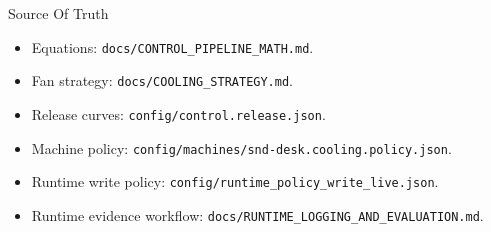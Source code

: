 \documentclass[aspectratio=169]{beamer}
\newcommand{\cfg}{\texttt}
\begin{document}
\begin{frame}{Source Of Truth}
  \begin{itemize}
    \item Equations: \cfg{docs/CONTROL\_PIPELINE\_MATH.md}.
    \item Fan strategy: \cfg{docs/COOLING\_STRATEGY.md}.
    \item Release curves: \cfg{config/control.release.json}.
    \item Machine policy: \cfg{config/machines/snd-desk.cooling.policy.json}.
    \item Runtime write policy: \cfg{config/runtime\_policy\_write\_live.json}.
    \item Runtime evidence workflow:
      \cfg{docs/RUNTIME\_LOGGING\_AND\_EVALUATION.md}.
  \end{itemize}
\end{frame}
\end{document}
